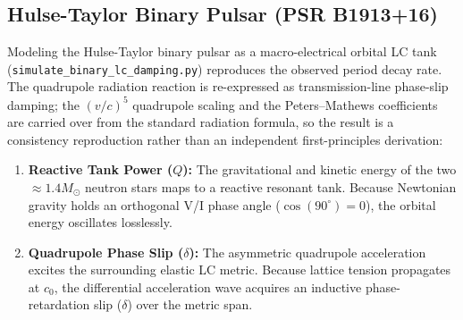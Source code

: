 \subsection{Hulse-Taylor Binary Pulsar (PSR B1913+16)}
Modeling the Hulse-Taylor binary pulsar as a macro-electrical orbital LC tank (\texttt{simulate\_\allowbreak binary\_\allowbreak lc\_\allowbreak damping.py}) reproduces the observed period decay rate. The quadrupole radiation reaction is re-expressed as transmission-line phase-slip damping; the $(v/c)^5$ quadrupole scaling and the Peters--Mathews coefficients are carried over from the standard radiation formula, so the result is a consistency reproduction rather than an independent first-principles derivation:

\begin{enumerate}
    \item \textbf{Reactive Tank Power ($Q$):} The gravitational and kinetic energy of the two $\approx 1.4 M_\odot$ neutron stars maps to a reactive resonant tank. Because Newtonian gravity holds an orthogonal V/I phase angle ($\cos(90^\circ) = 0$), the orbital energy oscillates losslessly.
    \item \textbf{Quadrupole Phase Slip ($\delta$):} The asymmetric quadrupole acceleration excites the surrounding elastic LC metric. Because lattice tension propagates at $c_0$, the differential acceleration wave acquires an inductive phase-retardation slip ($\delta$) over the metric span.

\end{enumerate}
